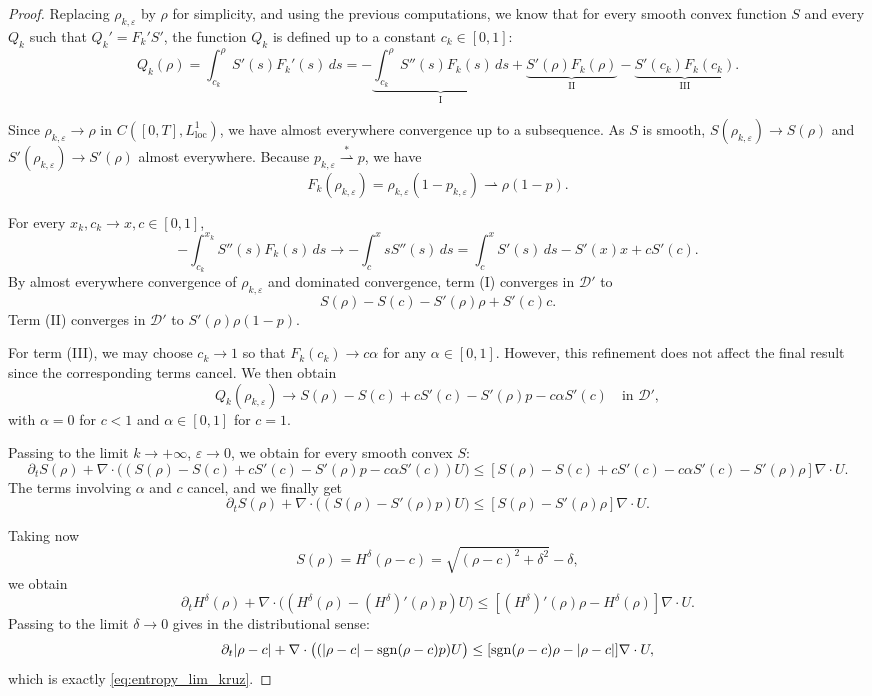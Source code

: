 \documentclass[11pt,twoside]{article}
\numberwithin{equation}{section}
\newcommand {\eps}  {\varepsilon}
\newcommand {\sgn} { {\rm sgn} }
\begin{document}
\begin{proof}
Replacing $\rho_{k,\eps}$ by $\rho$ for simplicity, and using the previous computations, we know that for every smooth convex function $S$ and every $Q_k$ such that $Q_k' = F_k' S'$, the function $Q_k$ is defined up to a constant $c_k\in[0,1]$:
\[
Q_k(\rho)
= \int_{c_k}^{\rho} S'(s)F_k'(s)\,ds
= -\underbrace{\int_{c_k}^{\rho} S''(s)F_k(s)\,ds}_{\mathrm{I}}
+\underbrace{S'(\rho)F_k(\rho)}_{\mathrm{II}}
-\underbrace{S'(c_k)F_k(c_k)}_{\mathrm{III}}.
\]

Since $\rho_{k,\eps}\to\rho$ in $C([0,T],L^1_{\mathrm{loc}})$, we have almost everywhere convergence up to a subsequence.  
As $S$ is smooth, $S(\rho_{k,\eps})\to S(\rho)$ and $S'(\rho_{k,\eps})\to S'(\rho)$ almost everywhere.  
Because $p_{k,\eps}\overset{*}{\rightharpoonup}p$, we have
\[
F_k(\rho_{k,\eps})
=\rho_{k,\eps}(1-p_{k,\eps})
\rightharpoonup \rho(1-p).
\]

For every $x_k,c_k\to x,c\in[0,1]$,
\[
-\int_{c_k}^{x_k} S''(s)F_k(s)\,ds
\longrightarrow
-\int_c^x sS''(s)\,ds
= \int_c^x S'(s)\,ds - S'(x)x + cS'(c).
\]
By almost everywhere convergence of $\rho_{k,\eps}$ and dominated convergence, term (I) converges in $\mathcal{D}'$ to
\[
S(\rho)-S(c)-S'(\rho)\rho + S'(c)c.
\]
Term (II) converges in $\mathcal{D}'$ to $S'(\rho)\rho(1-p)$.

For term (III), we may choose $c_k\to 1$ so that $F_k(c_k)\to c\alpha$ for any $\alpha\in[0,1]$. However, this refinement does not affect the final result since the corresponding terms cancel. We then obtain
\[
Q_k(\rho_{k,\eps})
\to
S(\rho)-S(c)+cS'(c)-S'(\rho)p-c\alpha S'(c)
\quad\text{in }\mathcal{D}',
\]
with $\alpha=0$ for $c<1$ and $\alpha\in[0,1]$ for $c=1$.

Passing to the limit $k\to+\infty$, $\eps\to0$, we obtain for every smooth convex $S$:
\[
\partial_t S(\rho)
+\nabla\cdot\big((S(\rho)-S(c)+cS'(c)-S'(\rho)p-c\alpha S'(c))U\big)
\le
[S(\rho)-S(c)+cS'(c)-c\alpha S'(c)-S'(\rho)\rho]\nabla\cdot U.
\]
The terms involving $\alpha$ and $c$ cancel, and we finally get
\begin{equation}
\partial_t S(\rho)
+\nabla\cdot\big((S(\rho)-S'(\rho)p)U\big)
\le
[S(\rho)-S'(\rho)\rho]\nabla\cdot U.
\end{equation}

Taking now
\[
S(\rho)=H^\delta(\rho-c)
=\sqrt{(\rho-c)^2+\delta^2}-\delta,
\]
we obtain
\[
\partial_t H^\delta(\rho)
+\nabla\cdot\big((H^\delta(\rho)-(H^\delta)'(\rho)p)U\big)
\le
[(H^\delta)'(\rho)\rho-H^\delta(\rho)]\nabla\cdot U.
\]
Passing to the limit $\delta\to0$ gives in the distributional sense:
\[
\partial_t |\rho-c|
+\nabla\cdot\big((|\rho-c|-\sgn(\rho-c)p)U\big)
\le
[\sgn(\rho-c)\rho-|\rho-c|]\nabla\cdot U,
\]
which is exactly \eqref{eq:entropy_lim_kruz}.
\end{proof}
\end{document}
